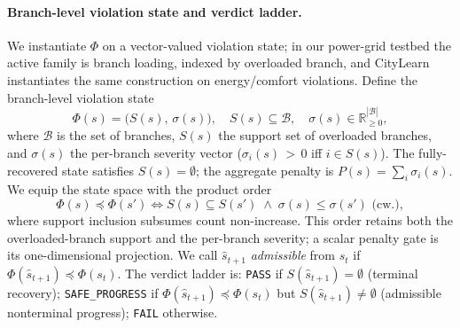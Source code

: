 \documentclass[letterpaper]{article} %
\theoremstyle{plain}
\begin{document}
\paragraph{Branch-level violation state and verdict ladder.}
We instantiate $\Phi$ on a vector-valued violation state; in our power-grid testbed the active family is branch loading, indexed by overloaded branch, and CityLearn instantiates the same construction on energy/comfort violations. Define the branch-level violation state
\begin{equation}
\Phi(s) = \bigl(S(s),\,\sigma(s)\bigr),
\quad S(s)\subseteq\mathcal{B},
\quad \sigma(s)\in\mathbb{R}_{\ge 0}^{|\mathcal{B}|},
\label{eq:phi}
\end{equation}
where $\mathcal{B}$ is the set of branches, $S(s)$ the support set of overloaded branches, and $\sigma(s)$ the per-branch severity vector ($\sigma_i(s)\,{>}\,0$ iff $i\in S(s)$). The fully-recovered state satisfies $S(s)=\emptyset$; the aggregate penalty is $P(s)=\sum_i\sigma_i(s)$. We equip the state space with the product order
\begin{equation}
\Phi(s)\preceq\Phi(s') \iff S(s)\subseteq S(s') \;\wedge\; \sigma(s)\le\sigma(s')\text{ (cw.)},
\end{equation}
where support inclusion subsumes count non-increase. This order retains both the overloaded-branch support and the per-branch severity; a scalar penalty gate is its one-dimensional projection. We call $\hat{s}_{t+1}$ \emph{admissible} from $s_t$ if $\Phi(\hat{s}_{t+1})\preceq\Phi(s_t)$. The verdict ladder is: \texttt{PASS} if $S(\hat{s}_{t+1})=\emptyset$ (terminal recovery); \texttt{SAFE\_PROGRESS} if $\Phi(\hat{s}_{t+1})\preceq\Phi(s_t)$ but $S(\hat{s}_{t+1})\ne\emptyset$ (admissible nonterminal progress); \texttt{FAIL} otherwise.
\end{document}
